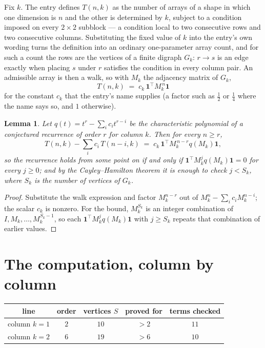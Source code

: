 \documentclass[11pt,a4paper]{article}
\theoremstyle{plain}
\newtheorem{lemma}[theorem]{Lemma}
\theoremstyle{definition}
\begin{document}
Fix $k$. The entry defines $T(n,k)$ as the number of arrays of a shape in which one dimension
is $n$ and the other is determined by $k$, subject to a condition imposed on every
$2\times2$ subblock --- a condition local to two consecutive rows and two consecutive columns.
Substituting the fixed value of $k$ into the entry's own wording turns the definition into an
ordinary one-parameter array count, and for such a count the rows are the vertices of a finite
digraph $G_k$: $r\to s$ is an edge exactly when placing $s$ under $r$ satisfies the condition
in every column pair. An admissible array is then a walk, so with $M_k$ the adjacency matrix
of $G_k$,
\[
T(n,k)\;=\;c_k\,\mathbf{1}^{\!\top}M_k^{\,n}\mathbf{1}
\]
for the constant $c_k$ that the entry's name supplies (a factor such as $\tfrac12$ or
$\tfrac14$ where the name says so, and $1$ otherwise).

\begin{lemma}\label{lem:crit}
Let $q(t)=t^{r}-\sum_i c_it^{r-i}$ be the characteristic polynomial of a conjectured
recurrence of order $r$ for column $k$. Then for every $n\ge r$,
\[
T(n,k)-\sum_i c_i\,T(n-i,k)\;=\;c_k\,\mathbf{1}^{\!\top}M_k^{\,n-r}q(M_k)\mathbf{1},
\]
so the recurrence holds from some point on if and only if
$\mathbf{1}^{\!\top}M_k^{j}q(M_k)\mathbf{1}=0$ for every $j\ge0$; and by the
Cayley--Hamilton theorem it is enough to check $j<S_k$, where $S_k$ is the number of vertices
of $G_k$.
\end{lemma}

\begin{proof}
Substitute the walk expression and factor $M_k^{n-r}$ out of $M_k^{n}-\sum_ic_iM_k^{n-i}$;
the scalar $c_k$ is nonzero. For the bound, $M_k^{S_k}$ is an integer combination of
$I,M_k,\dots,M_k^{S_k-1}$, so each $\mathbf{1}^{\!\top}M_k^{j}q(M_k)\mathbf{1}$ with
$j\ge S_k$ repeats that combination of earlier values.
\end{proof}

\section{The computation, column by column}

\begin{center}
\begin{tabular}{ccccc}
line & order & vertices $S$ & proved for & terms checked \\ \hline
column $k$$=1$ & $2$ & $10$ & $>2$ & $11$ \\
column $k$$=2$ & $6$ & $19$ & $>6$ & $10$ \\
\end{tabular}
\end{center}
\end{document}

